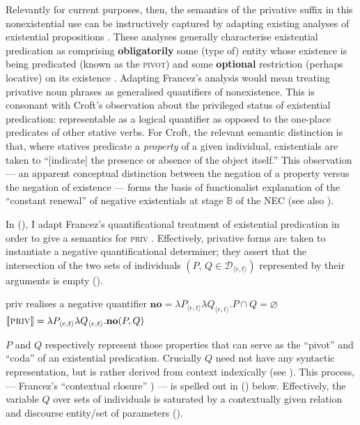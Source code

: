 Relevantly for current purposes, then, the semantics of the privative suffix in this nonexistential use can be instructively captured by adapting existing analyses of existential propositions \citep[\textit{e.g.},][]{Francez2007,McNally2016}. These analyses generally characterise existential predication as comprising \textbf{obligatorily} some (type of) entity whose existence is being predicated (known as the \textsc{pivot)} and some \textbf{optional} restriction (perhaps locative) on its existence \citep[the \textsc{coda}; see][]{Francez2007}. Adapting Francez's analysis would mean treating privative noun phrases as generalised quantifiers of nonexistence. This is consonant with Croft's \citeyearpar[18]{Croft1991} observation about the privileged status of existential predication: representable as a logical quantifier as opposed to the one-place predicates of other stative verbs. For Croft, the relevant semantic distinction is that, where statives predicate a \textit{property} of a given individual, existentials are taken to ``[indicate] the presence or absence of the object itself.''  This observation --- an apparent conceptual distinction between the negation of a property versus the negation of existence --- forms the basis of functionalist explanation of the ``constant renewal'' of negative existentials at stage $\mathbb{B}$ of the NEC (see also \citealt[173]{Veselinova2016}).


In (), I adapt Francez's quantificational treatment of existential predication in order to give a semantics for \textsc{priv} \citep{Francez2007,Francez2011}. Effectively, privative forms are taken to instantiate a negative quantificational determiner; they assert that the intersection of the two sets of individuals $ (P,\,Q\in\mathcal D_{\langle e,t\rangle} )$ represented by their arguments is empty (\citealp[169]{Barwise1981}).

\pex \gls{priv} realises a negative quantifier
\a$\textbf{no}=\lambda P_{\langle e,t\rangle}\lambda Q_{\langle e,t\rangle}.P\cap Q=\varnothing$%
\a $\llbracket\textsc{priv}\rrbracket=\lambda P_{\langle e,t\rangle}\lambda Q_{\langle e,t\rangle}.\textbf{no}(P,Q)$\xe


$ P $ and $ Q $ respectively represent those properties that can serve as the ``pivot'' and ``coda'' of an existential predication. Crucially $ Q $ need not have any syntactic representation, but is rather derived from context indexically (see ). This process, --- Francez's ``contextual closure'' \citeyearpar[72]{Francez2007}) --- is spelled out in () below. Effectively, the variable $ Q $ over sets of individuals is saturated by a contextually given relation and discourse entity/set of parameters ().

